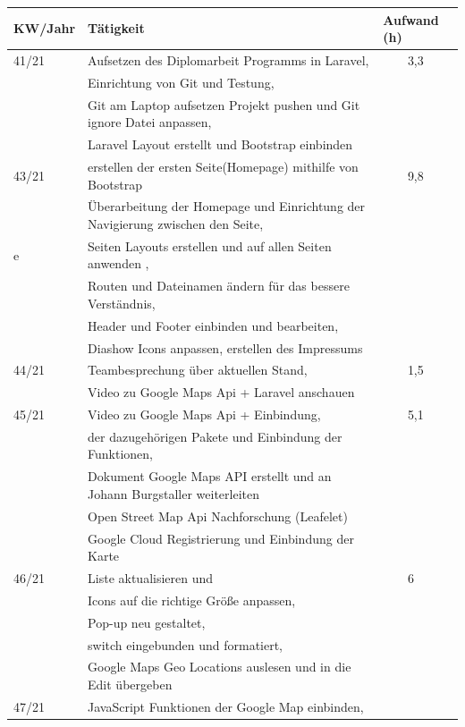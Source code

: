 \begin{table}[h]
	\begin{tabular}{|l|lll|}
		\hline
		KW/Jahr &
		\multicolumn{1}{l|}{Tätigkeit} &
		\multicolumn{2}{l|}{Aufwand (h)} \\ \hline
		41/21 &
		\multicolumn{2}{l|}{Aufsetzen des Diplomarbeit Programms in Laravel,} &
		3,3 \\ &Einrichtung von Git und Testung,\\&Git am Laptop aufsetzen Projekt pushen und Git ignore Datei anpassen,\\&Laravel Layout erstellt und Bootstrap einbinden\\\hline
		43/21 &
		\multicolumn{2}{l|}{erstellen der ersten Seite(Homepage) mithilfe von Bootstrap} &
		9,8 \\ &Überarbeitung der Homepage und Einrichtung der Navigierung zwischen den Seite, \\e&Seiten Layouts erstellen und auf allen Seiten anwenden ,\\&Routen und Dateinamen ändern für das bessere Verständnis,\\& Header  und Footer  einbinden und bearbeiten,\\&Diashow Icons anpassen, erstellen des Impressums\\\hline
		44/21 &
		\multicolumn{2}{l|}{Teambesprechung über aktuellen Stand, } &
		1,5 \\&Video zu Google Maps Api + Laravel anschauen\\ \hline
		45/21 &
		\multicolumn{2}{l|}{Video zu Google Maps Api + Einbindung, } &
		5,1 \\ &der dazugehörigen Pakete und Einbindung der Funktionen,\\&  Dokument Google Maps API erstellt und an Johann Burgstaller weiterleiten\\&Open Street Map Api Nachforschung (Leafelet)\\&Google Cloud Registrierung und Einbindung der Karte\\\hline
		46/21 &
		\multicolumn{2}{l|}{Liste aktualisieren und    } &
		6 \\ &Icons auf die richtige Größe anpassen,\\&Pop-up neu gestaltet,\\&switch eingebunden und formatiert,\\&Google Maps Geo Locations auslesen und in die Edit übergeben\\\hline
		47/21 &
		\multicolumn{2}{l|}{JavaScript Funktionen der Google Map einbinden, } &

\end{tabular}
\end{table}
